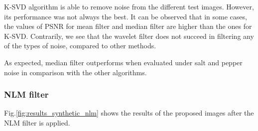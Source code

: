 K-SVD algorithm is able to remove noise from the different test images. However, its performance was not always the best. It can be observed that in some cases, the values of PSNR for mean filter and median filter are higher than the ones for K-SVD. Contrarily, we see that the wavelet filter does not succeed in filtering any of the types of noise, compared to other methods. 

As expected, median filter outperforms when evaluated under salt and pepper noise in comparison with the other algorithms. 


\subsubsection{NLM filter}
Fig.\ref{fig:results_synthetic_nlm} shows the results of the proposed images after the NLM filter is applied.
